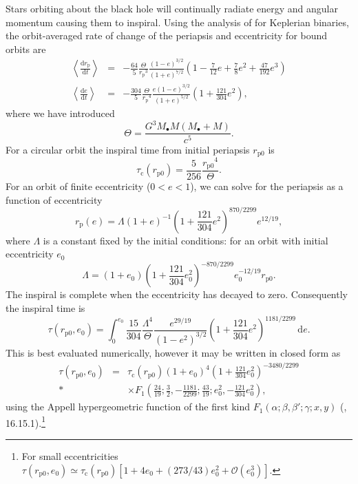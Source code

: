\documentclass[useAMS,usedcolumn,usegraphicx,usenatbib]{mn2e}
\newcommand{\sub}[1]{\ensuremath{_\mathrm{#1}}}
\newcommand{\dd}{\ensuremath{\mathrm{d}}}
\newcommand{\diff}[2]{\ensuremath{\frac{\dd {#1}}{\dd {#2}}}}
\newcommand{\intd}[4]{\ensuremath{\int_{#1}^{#2}{#3}\,\dd{#4}}}
\newcommand{\order}[1]{\ensuremath{\mathcal{O}({#1})}}
\begin{document}
Stars orbiting about the black hole will continually radiate energy and angular momentum causing them to inspiral. Using the analysis of \citet{Peters1964} for Keplerian binaries, the orbit-averaged rate of change of the periapsis and eccentricity for bound orbits are
\begin{eqnarray}
\left\langle\diff{r\sub{p}}{t}\right\rangle &=& -\frac{64}{5}\frac{\Theta}{r\sub{p}^3}\frac{(1 - e)^{3/2}}{(1 + e)^{7/2}}\left(1 - \frac{7}{12}e + \frac{7}{8}e^2 + \frac{47}{192}e^3\right) \\
\left\langle\diff{e}{t}\right\rangle &=& -\frac{304}{5}\frac{\Theta}{r\sub{p}^4}\frac{e(1 - e)^{3/2}}{(1 + e)^{5/2}}\left(1 + \frac{121}{304}e^2\right),
\end{eqnarray}
where we have introduced
\begin{equation}
\Theta = \frac{G^3M_\bullet M(M_\bullet + M)}{c^5}.
\end{equation}
For a circular orbit the inspiral time from initial periapsis $r\sub{p0}$ is
\begin{equation}
\tau\sub{c}(r\sub{p0}) = \frac{5}{256}\frac{r\sub{p0}^4}{\Theta}.
\end{equation}
For an orbit of finite eccentricity ($0 < e < 1$), we can solve for the periapsis as a function of eccentricity
\begin{equation}
r\sub{p}(e) = \Lambda(1 + e)^{-1}\left(1 + \frac{121}{304}e^2\right)^{870/2299}e^{12/19},
\end{equation}
where $\Lambda$ is a constant fixed by the initial conditions: for an orbit with initial eccentricity $e_0$
\begin{equation}
\Lambda = (1 + e_0)\left(1 + \frac{121}{304}e_0^2\right)^{-870/2299}e_0^{-12/19}r\sub{p0}.
\end{equation}
The inspiral is complete when the eccentricity has decayed to zero. Consequently the inspiral time is~\citep{Peters1964}
\begin{equation}
\tau(r\sub{p0},e_0) = \intd{0}{e_0}{\frac{15}{304}\frac{\Lambda^4}{\Theta}\frac{e^{29/19}}{(1-e^2)^{3/2}}\left(1 + \frac{121}{304}e^2\right)^{1181/2299}}{e}.
\end{equation}
This is best evaluated numerically, however it may be written in closed form as
\begin{eqnarray}
\tau(r\sub{p0},e_0) &=& \tau\sub{c}(r\sub{p0})(1 + e_0)^4\left(1 + \frac{121}{304}e_0^2\right)^{-3480/2299} \nonumber\\*
 & & \times F_1\left(\frac{24}{19};\frac{3}{2},-\frac{1181}{2299};\frac{43}{19};e_0^2,-\frac{121}{304}e_0^2\right),
\end{eqnarray}
using the Appell hypergeometric function of the first kind $F_1(\alpha;\beta,\beta';\gamma;x,y)$ (\citealt{Olver2010}, 16.15.1).\footnote{For small eccentricities $\tau(r\sub{p0},e_0) \simeq \tau\sub{c}(r\sub{p0})[1 + 4e_0 + (273/43)e_0^2 + \order{e_0^3}]$.}
\end{document}
